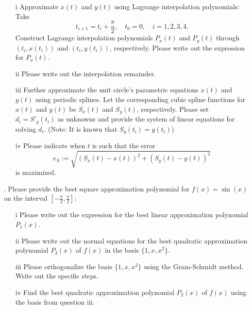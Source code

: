 \documentclass[a4paper]{ctexart}
\begin{document}
\begin{enumerate}
    \item[i] Approximate \( x(t) \) and \( y(t) \) 
    using Lagrange interpolation polynomials: Take
    \[
    t_{i+1} = t_i + \frac{\pi}{2}, \quad t_0 = 0, \quad i = 1, 2, 3, 4.
    \]
    Construct Lagrange interpolation polynomials \( P_x(t) \) and \( P_y(t) \) 
    through \( (t_i, x(t_i)) \) and \( (t_i, y(t_i)) \), respectively. 
    Please write out the expression for \( P_x(t) \).
    \item[ii] Please write out the interpolation remainder.
    \item[iii] Further approximate the unit circle's parametric equations 
    \( x(t) \) and \( y(t) \) using periodic splines. 
    Let the corresponding cubic spline functions for \( x(t) \) and 
    \( y(t) \) be \( S_x(t) \) and \( S_y(t) \), respectively. 
    Please set \( d_i = S'_y(t_i) \) as unknowns and provide 
    the system of linear equations for solving \( d_i \).
    (Note: It is known that \( S_y(t_i) = y(t_i) \))
    \item[iv] Please indicate when \( t \) is such that the error
    \[
    e_S := \sqrt{(S_x(t) - x(t))^2 + (S_y(t) - y(t))^2}
    \]
    is maximized.
\end{enumerate}

. Please provide the best square approximation polynomial for 
\( f(x) = \sin(x) \) on the interval \([- \frac{\pi}{2}, \frac{\pi}{2}]\):

\begin{itemize}
    \item[i] Please write out the expression 
    for the best linear approximation polynomial \( P_1(x) \).
    \item[ii] Please write out the normal equations 
    for the best quadratic approximation polynomial \( P_2(x) \) of \( f(x) \) 
    in the basis \( \{1, x, x^2\} \).
    \item[iii] Please orthogonalize the basis \( \{1, x, x^2\} \) 
    using the Gram-Schmidt method. Write out the specific steps.
    \item[iv] Find the best quadratic approximation polynomial \( P_2(x) \) 
    of \( f(x) \) using the basis from question iii.
\end{itemize}
\end{document}
